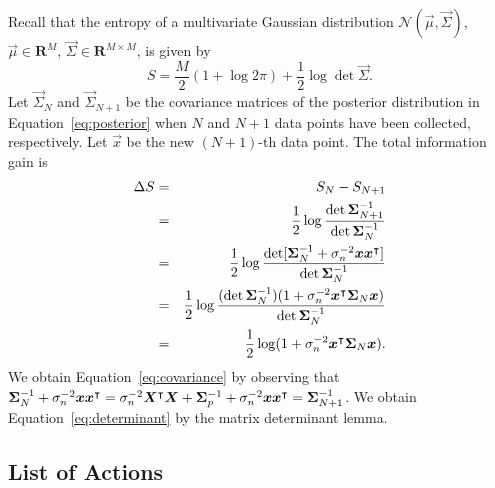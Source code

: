 Recall that the entropy of a multivariate Gaussian distribution $ \mathcal{N}(\vec{\mu}, \vec{\Sigma}) $, $\vec{\mu} \in \mathbf{R}^M$, $\vec{\Sigma} \in \mathbf{R}^{M \times M}$, is given by
\begin{equation}
	S = \frac{M}{2}(1 + \log 2 \pi) + \frac{1}{2} \log \det \vec{\Sigma}.
\end{equation}
Let $\vec{\Sigma}_N$ and  $\vec{\Sigma}_{N+1}$ be the covariance matrices of the posterior distribution in Equation~\eqref{eq:posterior} when $N$ and $N+1$ data points have been collected, respectively.
Let $\vec{x}$ be the new $(N+1)$-th data point.
The total information gain is
\begin{eqnarray}
	\Delta S &=& S_N - S_{N+1}  \nonumber \\
	&=& \frac{1}{2} \log \frac{\det \boldsymbol{\Sigma}_{N+1}^{-1}}{\det \boldsymbol{\Sigma}_N^{-1}} \nonumber \\
	&=& \frac{1}{2} \log \frac{\det [\boldsymbol{\Sigma}_N^{-1} + \sigma_n^{-2}\boldsymbol{x}\boldsymbol{x}^\intercal] }{\det \boldsymbol{\Sigma}_N^{-1}} \label{eq:covariance} \\
	&=& \frac{1}{2} \log \frac{(\det \boldsymbol{\Sigma}_N^{-1})(1 + \sigma_n^{-2} \boldsymbol{x}^\intercal \boldsymbol{\Sigma}_N \boldsymbol{x} ) }{ \det \boldsymbol{\Sigma}_N^{-1} } \label{eq:determinant} \\
	&=& \frac{1}{2} \log (1 + \sigma_n^{-2} \boldsymbol{x}^\intercal \boldsymbol{\Sigma}_N \boldsymbol{x}). \nonumber
\end{eqnarray}
We obtain Equation~\eqref{eq:covariance} by observing that $ \boldsymbol{\Sigma}_N^{-1} + \sigma_n^{-2} \boldsymbol{x} \boldsymbol{x}^\intercal = \sigma_n^{-2} \boldsymbol{X}^\intercal \boldsymbol{X} + \boldsymbol{\Sigma}_p^{-1} + \sigma_n^{-2} \boldsymbol{x} \boldsymbol{x}^\intercal = \boldsymbol{\Sigma}_{N+1}^{-1}$.
We obtain Equation~\eqref{eq:determinant} by the matrix determinant lemma.

\subsection{List of Actions}
\label{app:actions}

